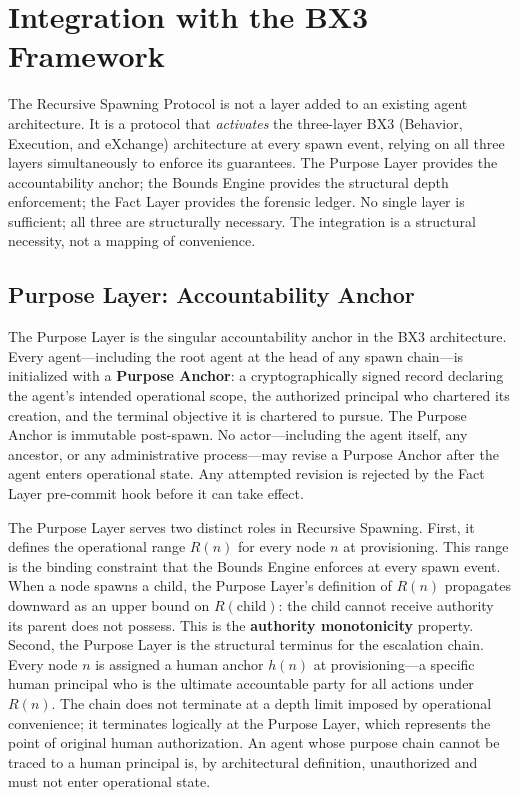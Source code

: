 \section{Integration with the BX3 Framework}
\label{sec:bx3-integration}

The Recursive Spawning Protocol is not a layer added to an existing agent architecture. It is a protocol that \emph{activates} the three-layer BX3 (Behavior, Execution, and eXchange) architecture at every spawn event, relying on all three layers simultaneously to enforce its guarantees. The Purpose Layer provides the accountability anchor; the Bounds Engine provides the structural depth enforcement; the Fact Layer provides the forensic ledger. No single layer is sufficient; all three are structurally necessary. The integration is a structural necessity, not a mapping of convenience.

\subsection{Purpose Layer: Accountability Anchor}

The Purpose Layer is the singular accountability anchor in the BX3 architecture. Every agent---including the root agent at the head of any spawn chain---is initialized with a \textbf{Purpose Anchor}: a cryptographically signed record declaring the agent's intended operational scope, the authorized principal who chartered its creation, and the terminal objective it is chartered to pursue. The Purpose Anchor is immutable post-spawn. No actor---including the agent itself, any ancestor, or any administrative process---may revise a Purpose Anchor after the agent enters operational state. Any attempted revision is rejected by the Fact Layer pre-commit hook before it can take effect.

The Purpose Layer serves two distinct roles in Recursive Spawning. First, it defines the operational range $R(n)$ for every node $n$ at provisioning. This range is the binding constraint that the Bounds Engine enforces at every spawn event. When a node spawns a child, the Purpose Layer's definition of $R(n)$ propagates downward as an upper bound on $R(\text{child})$: the child cannot receive authority its parent does not possess. This is the \textbf{authority monotonicity} property. Second, the Purpose Layer is the structural terminus for the escalation chain. Every node $n$ is assigned a human anchor $h(n)$ at provisioning---a specific human principal who is the ultimate accountable party for all actions under $R(n)$. The chain does not terminate at a depth limit imposed by operational convenience; it terminates logically at the Purpose Layer, which represents the point of original human authorization. An agent whose purpose chain cannot be traced to a human principal is, by architectural definition, unauthorized and must not enter operational state.

